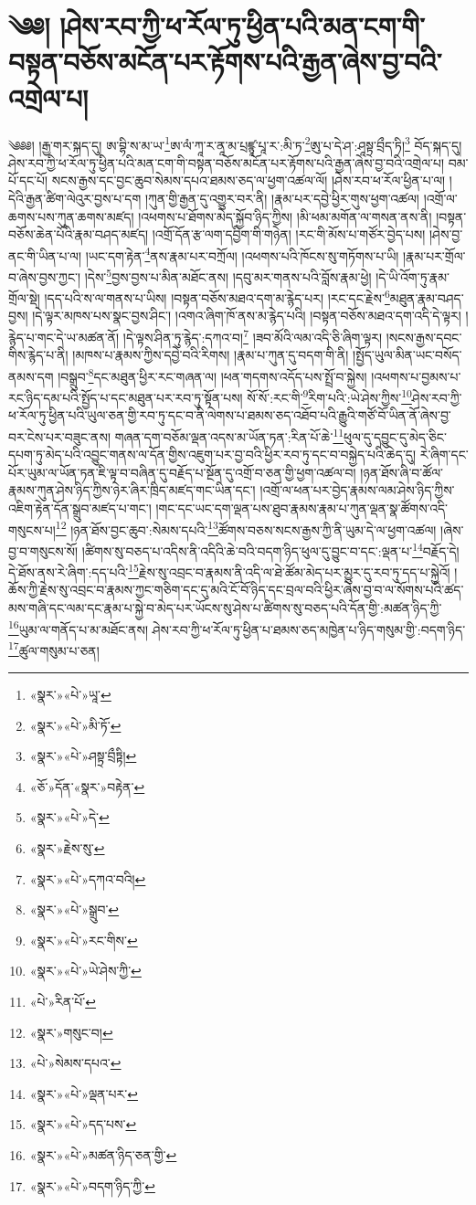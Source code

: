 \chapter{༄༅། །ཤེས་རབ་ཀྱི་ཕ་རོལ་ཏུ་ཕྱིན་པའི་མན་ངག་གི་བསྟན་བཅོས་མངོན་པར་རྟོགས་པའི་རྒྱན་ཞེས་བྱ་བའི་འགྲེལ་པ།}༄༅༅། །རྒྱ་གར་སྐད་དུ། ཨ་བྷི་ས་མ་ཡ་\footnote{«སྣར་»«པེ་»ཡཱ་}ཨ་ལཾ་ཀཱ་ར་ནཱ་མ་པྲཛྙཱ་པཱ་ར་:མི་ཏ་\footnote{«སྣར་»«པེ་»མི་ཏོ་}ཨུ་པ་དེ་ཤ་:ཤཱསྟྲ་བྲྀད་ཏི།\footnote{«སྣར་»«པེ་»ཤསྟྲ་བྲྀཏྟི།} བོད་སྐད་དུ། ཤེས་རབ་ཀྱི་ཕ་རོལ་ཏུ་ཕྱིན་པའི་མན་ངག་གི་བསྟན་བཅོས་མངོན་པར་རྟོགས་པའི་རྒྱན་ཞེས་བྱ་བའི་འགྲེལ་པ། བམ་པོ་དང་པོ། སངས་རྒྱས་དང་བྱང་ཆུབ་སེམས་དཔའ་ཐམས་ཅད་ལ་ཕྱག་འཚལ་ལོ། །ཤེས་རབ་ཕ་རོལ་ཕྱིན་པ་ལ། །དེའི་རྒྱན་ཚིག་ལེའུར་བྱས་པ་དག །ཀུན་གྱི་རྒྱན་དུ་འགྱུར་བར་ནི། །རྣམ་པར་དབྱེ་ཕྱིར་གུས་ཕྱག་འཚལ། །འགྲོ་ལ་ཆགས་པས་ཀུན་ཆགས་མཛད། །འཕགས་པ་ཐོགས་མེད་སྐྱོབ་ཉིད་ཀྱིས། །མི་ཕམ་མགོན་ལ་གསན་ནས་ནི། །བསྟན་བཅོས་ཆེན་པོའི་རྣམ་བཤད་མཛད། །འགྲོ་དོན་རྩ་ལག་དབྱིག་གི་གཉེན། །རང་གི་མོས་པ་གཙོར་བྱེད་པས། །ཤེས་བྱ་ནང་གི་ཡིན་པ་ལ། །ཡང་དག་རྟེན་\footnote{«ཅོ་»དོན་«སྣར་»བརྟེན་}ནས་རྣམ་པར་བཀྲོལ། །འཕགས་པའི་ཁོངས་སུ་གཏོགས་པ་ཡི། །རྣམ་པར་གྲོལ་བ་ཞེས་བྱས་ཀྱང་། །དེས་\footnote{«སྣར་»«པེ་»དེ་}བྱས་བྱས་པ་མིན་མཐོང་ནས། །དབུ་མར་གནས་པའི་བློས་རྣམ་ཕྱེ། །དེ་ཡི་འོག་ཏུ་རྣམ་གྲོལ་སྡེ། །དད་པའི་ས་ལ་གནས་པ་ཡིས། །བསྟན་བཅོས་མཐའ་དག་མ་རྙེད་པར། །རང་དང་རྗེས་\footnote{«སྣར་»རྗེས་སུ་}མཐུན་རྣམ་བཤད་བྱས། །དེ་ལྟར་མཁས་པས་སྣང་བྱས་ཤིང་། །འགའ་ཞིག་ཁོ་ནས་མ་རྙེད་པའི། །བསྟན་བཅོས་མཐའ་དག་འདི་དེ་ལྟར། །རྙེད་པ་གང་དེ་ཡ་མཚན་ནོ། །དེ་ལྟས་ཤིན་ཏུ་རྙེད་:དཀའ་བ།\footnote{«སྣར་»«པེ་»དཀའ་བའི།} །ཟབ་མོའི་ལམ་འདི་ཅི་ཞིག་ལྟར། །སངས་རྒྱས་དབང་གིས་རྙེད་པ་ནི། །མཁས་པ་རྣམས་ཀྱིས་དབྱེ་བའི་རིགས། །རྣམ་པ་ཀུན་དུ་བདག་གི་ནི། །སྤྱོད་ཡུལ་མིན་ཡང་བསོད་ནམས་དག །བསྒྲུབ་\footnote{«སྣར་»«པེ་»སྒྲུབ་}དང་མཐུན་ཕྱིར་རང་གཞན་ལ། །ཕན་གདགས་འདོད་པས་སྤྲོ་བ་སྐྱེས། །འཕགས་པ་བྱམས་པ་རང་ཉིད་དམ་པའི་སྤྱོད་པ་དང་མཐུན་པར་རབ་ཏུ་སྟོན་པས། སོ་སོ་:རང་གི་\footnote{«སྣར་»«པེ་»རང་གིས་}རིག་པའི་:ཡེ་ཤེས་ཀྱིས་\footnote{«སྣར་»«པེ་»ཡེ་ཤེས་ཀྱི་}ཤེས་རབ་ཀྱི་ཕ་རོལ་ཏུ་ཕྱིན་པའི་ཡུལ་ཅན་གྱི་རབ་ཏུ་དང་བ་ནི་ལེགས་པ་ཐམས་ཅད་འཐོབ་པའི་རྒྱུའི་གཙོ་བོ་ཡིན་ནོ་ཞེས་བྱ་བར་ངེས་པར་བཟུང་ནས། གཞན་དག་བཅོམ་ལྡན་འདས་མ་ཡོན་ཏན་:རིན་པོ་ཆེ་\footnote{«པེ་»རིན་པོ་}ཕུལ་དུ་དབྱུང་དུ་མེད་ཅིང་དཔག་ཏུ་མེད་པའི་འབྱུང་གནས་ལ་དོན་གྱིས་འཇུག་པར་བྱ་བའི་ཕྱིར་རབ་ཏུ་དང་བ་བསྐྱེད་པའི་ཆེད་དུ། རེ་ཞིག་དང་པོར་ཡུམ་ལ་ཡོན་ཏན་ཇི་ལྟ་བ་བཞིན་དུ་བརྗོད་པ་སྔོན་དུ་འགྲོ་བ་ཅན་གྱི་ཕྱག་འཚལ་བ། །ཉན་ཐོས་ཞི་བ་ཚོལ་རྣམས་ཀུན་ཤེས་ཉིད་ཀྱིས་ཉེར་ཞིར་ཁྲིད་མཛད་གང་ཡིན་དང་། །འགྲོ་ལ་ཕན་པར་བྱེད་རྣམས་ལམ་ཤེས་ཉིད་ཀྱིས་འཇིག་རྟེན་དོན་སྒྲུབ་མཛད་པ་གང་། །གང་དང་ཡང་དག་ལྡན་པས་ཐུབ་རྣམས་རྣམ་པ་ཀུན་ལྡན་སྣ་ཚོགས་འདི་གསུངས་པ།\footnote{«སྣར་»གསུང་བ།} །ཉན་ཐོས་བྱང་ཆུབ་:སེམས་དཔའི་\footnote{«པེ་»སེམས་དཔའ་}ཚོགས་བཅས་སངས་རྒྱས་ཀྱི་ནི་ཡུམ་དེ་ལ་ཕྱག་འཚལ། །ཞེས་བྱ་བ་གསུངས་སོ། །ཚིགས་སུ་བཅད་པ་འདིས་ནི་འདིའི་ཆེ་བའི་བདག་ཉིད་ཕུལ་དུ་བྱུང་བ་དང་:ལྡན་པ་\footnote{«སྣར་»«པེ་»ལྡན་པར་}བརྗོད་དེ། དེ་ཐོས་ནས་རེ་ཞིག་:དད་པའི་\footnote{«སྣར་»«པེ་»དད་པས་}རྗེས་སུ་འབྲང་བ་རྣམས་ནི་འདི་ལ་ཐེ་ཚོམ་མེད་པར་མྱུར་དུ་རབ་ཏུ་དད་པ་སྐྱེའོ། །ཆོས་ཀྱི་རྗེས་སུ་འབྲང་བ་རྣམས་ཀྱང་གཅིག་དང་དུ་མའི་ངོ་བོ་ཉིད་དང་བྲལ་བའི་ཕྱིར་ཞེས་བྱ་བ་ལ་སོགས་པའི་ཚད་མས་གཞི་དང་ལམ་དང་རྣམ་པ་སྐྱེ་བ་མེད་པར་ཡོངས་སུ་ཤེས་པ་ཚིགས་སུ་བཅད་པའི་དོན་གྱི་:མཚན་ཉིད་ཀྱི་\footnote{«སྣར་»«པེ་»མཚན་ཉིད་ཅན་གྱི་}ཡུམ་ལ་གནོད་པ་མ་མཐོང་ནས། ཤེས་རབ་ཀྱི་ཕ་རོལ་ཏུ་ཕྱིན་པ་ཐམས་ཅད་མཁྱེན་པ་ཉིད་གསུམ་གྱི་:བདག་ཉིད་\footnote{«སྣར་»«པེ་»བདག་ཉིད་ཀྱི་}ཚུལ་གསུམ་པ་ཅན། 
